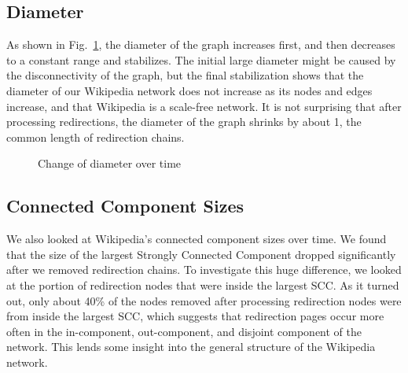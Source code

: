 \documentclass[10pt,twocolumn]{article}
\begin{document}
\subsection{Diameter}
As shown in Fig.~\ref{fig:diameter}, the diameter of the graph increases first, and then decreases to a constant range and stabilizes. The initial large diameter might be caused by the disconnectivity of the graph, but the final stabilization shows that the diameter of our Wikipedia network does not increase as its nodes and edges increase, and that Wikipedia is a scale-free network. It is not surprising that after processing redirections, the diameter of the graph shrinks by about 1, the common length of redirection chains.

\begin{figure}[ht]
\caption{Change of diameter over time\label{fig:diameter}}
\end{figure}

\subsection{Connected Component Sizes}
We also looked at Wikipedia's connected component sizes over time. We found that the size of the largest Strongly Connected Component dropped significantly after we removed redirection chains. To investigate this huge difference, we looked at the portion of redirection nodes that were inside the largest SCC. As it turned out, only about 40\% of the nodes removed after processing redirection nodes were from inside the largest SCC, which suggests that redirection pages occur more often in the in-component, out-component, and disjoint component of the network. This lends some insight into the general structure of the Wikipedia network.
\end{document}
